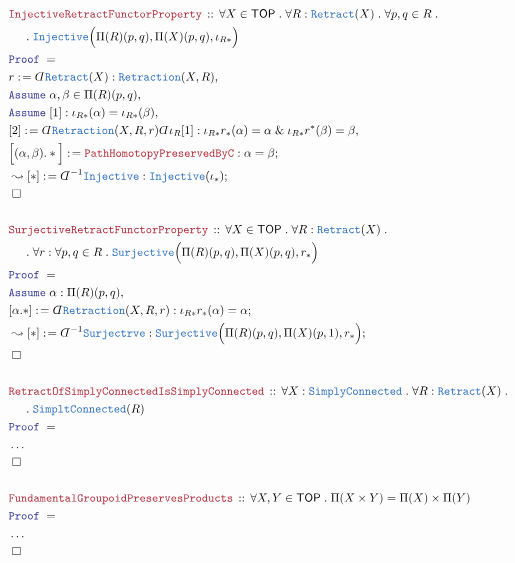 \documentclass[12pt]{scrartcl}
\newcommand{\TYPE}[1]{\textcolor{NavyBlue}{\mathtt{#1}}}
\newcommand{\LOGIC}[1]{\textcolor{Blue}{\mathtt{#1}}}
\newcommand{\THM}[1]{\textcolor{Maroon}{\mathtt{#1}}}
\renewcommand{\.}{\; . \;}
\newcommand{\de}{: \kern 0.1pc =}
\newcommand{\Theorem}[2]{& \THM{#1} \, :: \, #2 \\ & \Proof = \\ }
\newcommand{\NewLine}{\\ & \kern 1pc}
\newcommand{\Page}[1]{ \begin{align*} #1 \end{align*}   }
\newcommand{ \bd }{ \ByDef }
\newcommand{\NoProof}{ & \ldots \\ \EndProof}
\renewcommand{\And}{\; \& \;}
\newcommand{\Say}[3]{& #1 \de #2 : #3, \\}
\newcommand{\Conclude}[3]{& #1 \de #2 : #3; \\}
\newcommand{\DeriveConclude}[3]{& \leadsto #1 \de #2 : #3 ; \\}
\newcommand{\Assume}[2]{& \LOGIC{Assume} \; #1 : #2, \\}
\newcommand{\AssumeIn}[2]{& \LOGIC{Assume} \; #1 \in #2, \\}
\newcommand{\QED}{\; \square}
\newcommand{\EndProof}{& \QED \\}
\newcommand{\ByDef}{\rotatebox[origin=c]{-180}{$D$}}%
\newcommand{\Proof}{\LOGIC{Proof} \; }
\newcommand{\TOP}{\mathsf{TOP}}
\begin{document}
\Page{
	\Theorem{InjectiveRetractFunctorProperty}
	{
		\forall X \in \TOP \.
		\forall R : \TYPE{Retract}(X) \.
		\forall p,q \in R \. \NewLine \.
		\TYPE{Injective}\Big( \Pi(R)(p,q),\Pi(X)(p,q), \iota_{R*} \Big)
	}
	\Say{r}{\bd \TYPE{Retract}(X)}{\TYPE{Retraction}(X,R)}
	\AssumeIn{\alpha,\beta}{\Pi(R)(p,q)}
	\Assume{[1]}{\iota_{R*}(\alpha) = \iota_{R*}(\beta)}
	\Say{[2]}{\bd \TYPE{Retraction}(X,R,r) \bd \iota_R [1]}
	{
		\iota_{R*} r_*(\alpha) = \alpha 
		\And
		\iota_{R*} r^*(\beta) = \beta
	}
	\Conclude{\Big[(\alpha,\beta).*\Big]}{\THM{PathHomotopyPreservedByC}}
	{
		\alpha = \beta
	}
	\DeriveConclude{[*]}{\bd^{-1} \TYPE{Injective}}{\TYPE{Injective}(\iota_*)}
	\EndProof
	\\
	\Theorem{SurjectiveRetractFunctorProperty}
	{
		\forall X \in \TOP \.
		\forall R : \TYPE{Retract}(X) \. \NewLine \. 
		\forall r : 
		\forall p,q \in R \.
		\TYPE{Surjective}\Big( \Pi(R)(p,q),\Pi(X)(p,q), r_{*} \Big)
	}
	\Assume{\alpha}{\Pi(R)(p,q)}
	\Conclude{[\alpha.*]}{ \bd \TYPE{Retraction}(X,R,r)}
	{
		\iota_{R*} r_*(\alpha) = \alpha
	}
	\DeriveConclude{[*]}{\bd^{-1} \TYPE{Surjectrve} }
	{
		\TYPE{Surjective}\Big( \Pi(R)(p,q),\Pi(X)(p,1), r_* \Big)
	}
	\EndProof
	\\
	\Theorem{RetractOfSimplyConnectedIsSimplyConnected}
	{
		\forall X : \TYPE{SimplyConnected} \.
		\forall R : \TYPE{Retract}(X) \. \NewLine \. 
		\TYPE{SimpltConnected}(R)
	}
	\NoProof
	\\
	\Theorem{FundamentalGroupoidPreservesProducts}
	{
		\forall X,Y \in \TOP \. 
		\Pi(X \times Y) = \Pi(X) \times \Pi(Y)
	}
	\NoProof
}
\newpage
\end{document}
